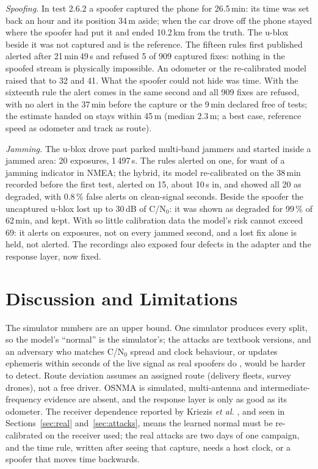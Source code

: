 \documentclass[conference]{IEEEtran}
\begin{document}
\emph{Spoofing.} In test 2.6.2 a spoofer captured the phone for 26.5\,min: its time was set back an hour and its position 34\,m aside; when the car drove off the phone stayed where the spoofer had put it and ended 10.2\,km from the truth. The u-blox beside it was not captured and is the reference. The fifteen rules first published alerted after 21\,min\,49\,s and refused 5 of 909 captured fixes: nothing in the spoofed stream is physically impossible. An odometer or the re-calibrated model raised that to 32 and 41. What the spoofer could not hide was time. With the sixteenth rule the alert comes in the same second and all 909 fixes are refused, with no alert in the 37\,min before the capture or the 9\,min declared free of tests; the estimate handed on stays within 45\,m (median 2.3\,m; a best case, reference speed as odometer and track as route).

\emph{Jamming.} The u-blox drove past parked multi-band jammers and started inside a jammed area: 20 exposures, 1\,497\,s. The rules alerted on one, for want of a jamming indicator in NMEA; the hybrid, its model re-calibrated on the 38\,min recorded before the first test, alerted on 15, about 10\,s in, and showed all 20 as degraded, with 0.8\,\% false alerts on clean-signal seconds. Beside the spoofer the uncaptured u-blox lost up to 30\,dB of C/N$_0$: it was shown as degraded for 99\,\% of 62\,min, and kept. With so little calibration data the model's risk cannot exceed 69: it alerts on exposures, not on every jammed second, and a lost fix alone is held, not alerted. The recordings also exposed four defects in the adapter and the response layer, now fixed.

\section{Discussion and Limitations}\label{sec:discussion}
The simulator numbers are an upper bound. One simulator produces every split, so the model's ``normal'' is the simulator's; the attacks are textbook versions, and an adversary who matches C/N$_0$ spread and clock behaviour, or updates ephemeris within seconds of the live signal as real spoofers do \cite{kriezis2025}, would be harder to detect. Route deviation assumes an assigned route (delivery fleets, survey drones), not a free driver. OSNMA is simulated, multi-antenna and intermediate-frequency evidence are absent, and the response layer is only as good as its odometer. The receiver dependence reported by Kriezis \emph{et al.} \cite{kriezis2025}, and seen in Sections~\ref{sec:real} and~\ref{sec:attacks}, means the learned normal must be re-calibrated on the receiver used; the real attacks are two days of one campaign, and the time rule, written after seeing that capture, needs a host clock, or a spoofer that moves time backwards.
\end{document}

